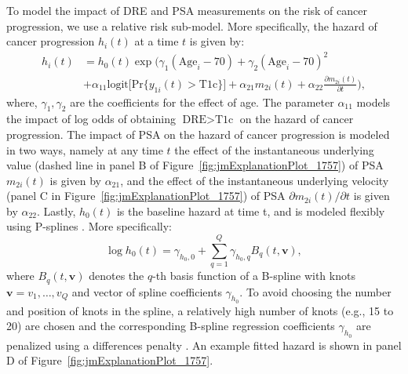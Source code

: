 To model the impact of DRE and PSA measurements on the risk of cancer progression, we use a relative risk sub-model. More specifically, the hazard of cancer progression $h_i(t)$ at a time $t$ is given by:
\begin{equation}
\label{eq:rel_risk_model}
\begin{split}
    h_i(t) &= h_0(t) \exp\Big(\gamma_1 (\mbox{Age}_i-70) + \gamma_2 (\mbox{Age}_i-70)^2\\
    &+\alpha_{11} \mbox{logit} \big[\mbox{Pr}\{y_{1i}(t) > \mbox{T1c}\}\big]+ \alpha_{21} m_{2i}(t) + \alpha_{22} \frac{\partial m_{2i}(t)}{\partial {t}}\Big),
    \end{split}
\end{equation}
where, $\gamma_1, \gamma_2$ are the coefficients for the effect of age. The parameter $\alpha_{11}$ models the impact of log odds of obtaining $\mbox{DRE} > \mbox{T1c}$ on the hazard of cancer progression. The impact of PSA on the hazard of cancer progression is modeled in two ways, namely at any time $t$ the effect of the instantaneous underlying value (dashed line in panel B of Figure~\ref{fig:jmExplanationPlot_1757}) of PSA $m_{2i}(t)$ is given by $\alpha_{21}$, and the effect of the instantaneous underlying velocity (panel C in Figure~\ref{fig:jmExplanationPlot_1757}) of PSA $\partial m_{2i}(t)/\partial {t}$ is given by $\alpha_{22}$. Lastly, $h_0(t)$ is the baseline hazard at time t, and is modeled flexibly using P-splines \citep{eilers1996flexible}. More specifically:
\begin{equation*}
\log{h_0(t)} = \gamma_{h_0,0} + \sum_{q=1}^Q \gamma_{h_0,q} B_q(t, \boldsymbol{v}),
\end{equation*}
where $B_q(t, \boldsymbol{v})$ denotes the $q$-th basis function of a B-spline with knots $\boldsymbol{v} = v_1, \ldots, v_Q$ and vector of spline coefficients $\gamma_{h_0}$. To avoid choosing the number and position of knots in the spline, a relatively high number of knots (e.g., 15 to 20) are chosen and the corresponding B-spline regression coefficients $\gamma_{h_0}$ are penalized using a differences penalty \citep{eilers1996flexible}. An example fitted hazard is shown in panel D of Figure~\ref{fig:jmExplanationPlot_1757}.  

